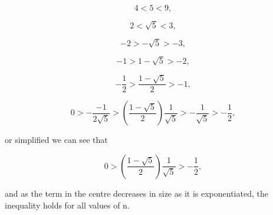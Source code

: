 \documentclass{article}
\begin{document}
\begin{equation}
  4 < 5 < 9,
\end{equation}

\begin{equation}
  2 < \sqrt{5} < 3,
\end{equation}

\begin{equation}
  -2 > - \sqrt{5} > -3,
\end{equation}

\begin{equation}
  -1 > 1 - \sqrt{5} > -2,
\end{equation}

\begin{equation}
  -\frac{1}{2} > \frac{1 - \sqrt{5}}{2} > -1,
\end{equation}

\begin{equation}
  0 > -\frac{-1}{2 \sqrt{5}} > \left( \frac{1 - \sqrt{5}}{2} \right) \frac{1}{\sqrt{5}} > -\frac{1}{\sqrt{5}} > - \frac{1}{2},
\end{equation}

or simplified we can see that

\begin{equation}
  0 > \left( \frac{1 - \sqrt{5}}{2} \right) \frac{1}{\sqrt{5}} > - \frac{1}{2},
\end{equation}

and as the term in the centre decreases in size as it is exponentiated, the inequality holds for all values of n.
\end{document}
